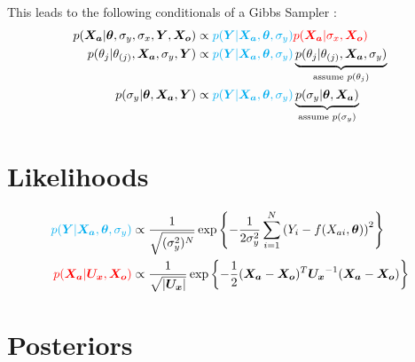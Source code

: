 \documentclass[10pt]{article}
\renewcommand{\vec}[1]{\boldsymbol{#1}}
\newcommand{\mat}[1]{\boldsymbol{#1}}
\begin{document}
This leads to the following conditionals of a Gibbs Sampler \cite{dellaportas_1995}:
\begin{align}
    p(\vec{X_a} | \vec{\theta}, \sigma_y, \sigma_x, \vec{Y}, \vec{X_o}) &\propto {\color{cyan} p(\vec{Y} | \vec{X_a}, \vec{\theta}, \sigma_y)} {\color{red} p(\vec{X_a} | \sigma_x, \vec{X_o})} \label{eq:posterior_X_a}\\
    p(\theta_j | \theta_{(j)}, \vec{X_a}, \sigma_y, \vec{Y}) &\propto {\color{cyan} p(\vec{Y} | \vec{X_a}, \vec{\theta}, \sigma_y)} \underbrace{p(\theta_j | \theta_{(j)}, \vec{X_a}, \sigma_{y})}_{\text{assume } p(\theta_j)} \label{eq:posterior_params} \\
    p(\sigma_y | \vec{\theta}, \vec{X_a}, \vec{Y}) &\propto {\color{cyan} p(\vec{Y} | \vec{X_a}, \vec{\theta}, \sigma_y)} \underbrace{p(\sigma_y | \vec{\theta}, \vec{X_a})}_{\text{assume } p(\sigma_y)} \label{eq:posterior_sigma_y}
\end{align}


\section{Likelihoods}
\begin{align}
    {\color{cyan} p(\vec{Y} | \vec{X_a}, \vec{\theta}, \sigma_y)} &\propto \frac{1}{\sqrt{(\sigma_y^2)^N}} \exp\left\{ - \frac{1}{2\sigma_y^2} \sum_{i=1}^N \left( Y_i - f(X_{ai}, \vec{\theta}) \right)^2 \right\} \label{eq:likelihood_Y} \\
    {\color{red} p(\vec{X_a} | \mat{U_x}, \vec{X_o})} &\propto \frac{1}{\sqrt{|\mat{U_x}|}} \exp\left\{ - \frac{1}{2} (\vec{X_a} - \vec{X_o})^T \mat{U_x}^{-1} (\vec{X_a} - \vec{X_o}) \right\} \label{eq:likelihood_Xa}
\end{align}    


\section{Posteriors}
\end{document}
